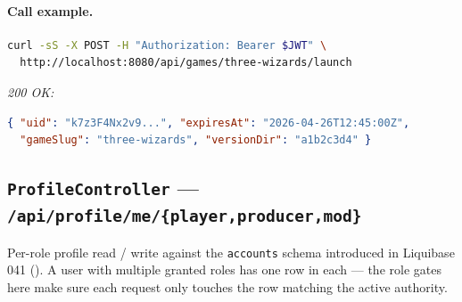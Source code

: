 
\paragraph{Call example.}
\begin{lstlisting}[language=bash]
curl -sS -X POST -H "Authorization: Bearer $JWT" \
  http://localhost:8080/api/games/three-wizards/launch
\end{lstlisting}
\textit{200 OK:}
\begin{lstlisting}[language=json]
{ "uid": "k7z3F4Nx2v9...", "expiresAt": "2026-04-26T12:45:00Z",
  "gameSlug": "three-wizards", "versionDir": "a1b2c3d4" }
\end{lstlisting}

\subsection{\texttt{ProfileController} — \texttt{/api/profile/me/\{player,producer,mod\}}}
Per-role profile read / write against the \texttt{accounts} schema
introduced in Liquibase 041
(). A user with
multiple granted roles has one row in each — the role gates here make
sure each request only touches the row matching the active authority.

